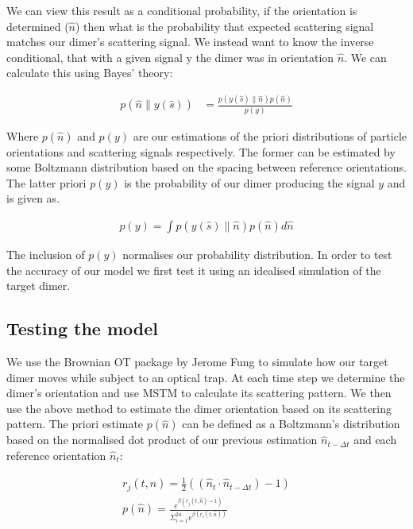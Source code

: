 \documentclass[final,3p, twocolumn]{elsarticle}
\begin{document}
We can view this result as a conditional probability, if the orientation is determined ($\hat{n}$) then what is the probability that expected scattering signal matches our dimer's scattering signal. We instead want to know the inverse conditional, that with a given signal y the dimer was in orientation $\hat{n}$. We can calculate this using Bayes' theory:

\begin{align}
	p(\hat{n}\parallel y(\hat{s}))&= \frac{p(y(\hat{s})\parallel\hat{n})p(\hat{n})}{p(y)}
\end{align}

Where $p(\hat{n})$ and $p(y)$ are our estimations of the priori distributions of particle orientations and scattering signals respectively. The former can be estimated by some Boltzmann distribution based on the spacing between reference orientations. The latter priori $p(y)$ is the probability of our dimer producing the signal $y$ and is given as. 

\begin{align}
	p(y) = \int p(y(\hat{s})\parallel \hat{n}) p(\hat{n}) d\hat{n}
\end{align}

The inclusion of $p(y)$ normalises our probability distribution. In order to test the accuracy of our model we first test it using an idealised simulation of the target dimer. 

\subsection{Testing the model}
\label{2.1}
We use the Brownian OT package by Jerome Fung \cite{Vigilante2020Brownian_OT} to simulate how our target dimer moves while subject to an optical trap. At each time step we determine the dimer's orientation and use MSTM to calculate its scattering pattern. We then use the above method to estimate the dimer orientation based on its scattering pattern. The priori estimate $p(\hat{n})$ can be defined as a Boltzmann's distribution based on the normalised dot product of our previous estimation $\hat{n}_{t-\Delta t}$ and each reference orientation $\hat{n}_t$:

\begin{align}
	r_j(t, \hat{n})= \frac{1}{2}((\hat{n}_{t} \cdot \hat{n}_{t-\Delta t})-1) \\
	p(\hat{n})= \frac{e^{\beta (r_j(t,\hat{n})-1)}}
	{\Sigma_{i=1}^{24}e^{\beta(r_i(t, \hat{n}))}}
\end{align}
\end{document}
